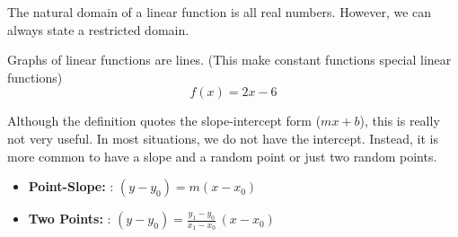 \documentclass{ximera}
\begin{document}
The natural domain of a linear function is all real numbers.  However, we can always state a restricted domain.







Graphs of linear functions are lines. 
(This make constant functions special linear functions)
\[ f(x) = 2x - 6\]





\begin{image}
\end{image}






Although the definition quotes the slope-intercept form ($m x + b$), this is really not very useful.  In most situations, we do not have the intercept.  Instead, it is more common to have a slope and a random point or just two random points.



\begin{itemize}

\item \textbf{\textcolor{blue!55!black}{Point-Slope:}}  : $(y - y_0) = m (x - x_0)$

\item \textbf{\textcolor{blue!55!black}{Two Points:}}  : $(y - y_0) = \frac{y_1 - y_0}{x_1 - x_0} \, (x - x_0)$

\end{itemize}
\end{document}
